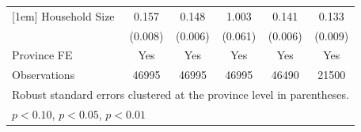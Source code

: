 {\begin{tabular}{l*{5}{c}}
[1em]
Household Size      &       0.157\sym{***}&       0.148\sym{***}&       1.003\sym{***}&       0.141\sym{***}&       0.133\sym{***}\\
                    &     (0.008)         &     (0.006)         &     (0.061)         &     (0.006)         &     (0.009)         \\
[1em]
Province FE         &         Yes         &         Yes         &         Yes         &         Yes         &         Yes         \\
\hline
Observations        &       46995         &       46995         &       46995         &       46490         &       21500         \\
\hline\hline
\multicolumn{6}{l}{\footnotesize Robust standard errors clustered at the province level in parentheses.}\\
\multicolumn{6}{l}{\footnotesize \sym{*} \(p<0.10\), \sym{**} \(p<0.05\), \sym{***} \(p<0.01\)}\\
\end{tabular}
}
